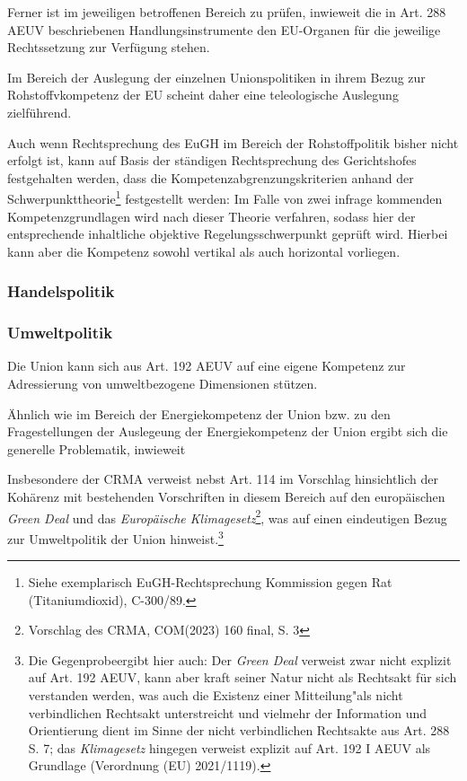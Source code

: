 \documentclass[12pt,a4paper,oneside]{book} %
\begin{document}
	Ferner ist im jeweiligen betroffenen Bereich zu prüfen, inwieweit die in Art. 288 AEUV beschriebenen Handlungsinstrumente den EU-Organen für die jeweilige Rechtssetzung zur Verfügung stehen.
	
	Im Bereich der Auslegung der einzelnen Unionspolitiken in ihrem Bezug zur Rohstoffvkompetenz der EU scheint daher eine teleologische Auslegung zielführend.
	
	Auch wenn Rechtsprechung des EuGH im Bereich der Rohstoffpolitik bisher nicht erfolgt ist, kann auf Basis der ständigen Rechtsprechung des Gerichtshofes festgehalten werden, dass die Kompetenzabgrenzungskriterien anhand der \glqq Schwerpunkttheorie\grqq\footnote{Siehe exemplarisch EuGH-Rechtsprechung Kommission gegen Rat (Titaniumdioxid), C-300/89.} festgestellt werden: Im Falle von zwei infrage kommenden Kompetenzgrundlagen wird nach dieser Theorie verfahren, sodass hier der entsprechende inhaltliche objektive Regelungsschwerpunkt geprüft wird\autocite[Callies, Art. 175, Rn 22 sowie Kahl, Art. 95, Rn 73ff]{callies_euvaeuv_2022}. Hierbei kann aber die Kompetenz sowohl vertikal als auch horizontal vorliegen.\autocite[30f.]{callies_stellungnahme_2007}
	
	\subsubsection{Handelspolitik}
	
	\subsubsection{Umweltpolitik}
	Die Union kann sich aus Art. 192 AEUV auf eine eigene Kompetenz zur Adressierung von umweltbezogene Dimensionen stützen.
	
	Ähnlich wie im Bereich der Energiekompetenz der Union bzw. zu den Fragestellungen der Auslegeung der Energiekompetenz der Union ergibt sich die generelle Problematik, inwieweit 
	
	Insbesondere der CRMA verweist nebst Art. 114 im Vorschlag hinsichtlich der Kohärenz mit bestehenden Vorschriften in diesem Bereich auf den europäischen \textit{Green Deal} und das \textit{Europäische Klimagesetz}\footnote{Vorschlag des CRMA, COM(2023) 160 final, S. 3}, was auf einen eindeutigen Bezug zur Umweltpolitik der Union hinweist.\footnote{Die \glqq Gegenprobe\grqq ergibt hier auch: Der \textit{Green Deal} verweist zwar nicht explizit auf Art. 192 AEUV, kann aber kraft seiner Natur nicht als Rechtsakt für sich verstanden werden, was auch die Existenz einer \glqq Mitteilung"\grqq als nicht verbindlichen Rechtsakt unterstreicht und vielmehr der Information und Orientierung dient im Sinne der nicht verbindlichen Rechtsakte aus Art. 288 S. 7; das \textit{Klimagesetz} hingegen verweist explizit auf Art. 192 I AEUV als Grundlage (Verordnung (EU) 2021/1119).}
	
\end{document}
